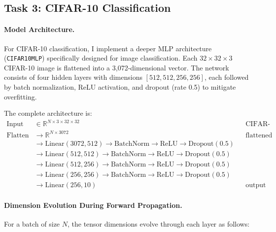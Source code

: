 \documentclass[11pt,a4paper]{article}
\begin{document}
\subsection{Task 3: CIFAR-10 Classification}
\paragraph{Model Architecture.} For CIFAR-10 classification, I implement a deeper MLP architecture (\texttt{CIFAR10MLP}) specifically designed for image classification. Each $32 \times 32 \times 3$ CIFAR-10 image is flattened into a 3,072-dimensional vector. The network consists of four hidden layers with dimensions $[512, 512, 256, 256]$, each followed by batch normalization, ReLU activation, and dropout (rate 0.5) to mitigate overfitting.

The complete architecture is:
\begin{align*}
\text{Input} &\in \mathbb{R}^{N \times 3 \times 32 \times 32} && \text{CIFAR-10 images} \\
\text{Flatten} &\rightarrow \mathbb{R}^{N \times 3072} && \text{flattened to vector} \\
&\rightarrow \text{Linear}(3072, 512) \rightarrow \text{BatchNorm} \rightarrow \text{ReLU} \rightarrow \text{Dropout}(0.5) \\
&\rightarrow \text{Linear}(512, 512) \rightarrow \text{BatchNorm} \rightarrow \text{ReLU} \rightarrow \text{Dropout}(0.5) \\
&\rightarrow \text{Linear}(512, 256) \rightarrow \text{BatchNorm} \rightarrow \text{ReLU} \rightarrow \text{Dropout}(0.5) \\
&\rightarrow \text{Linear}(256, 256) \rightarrow \text{BatchNorm} \rightarrow \text{ReLU} \rightarrow \text{Dropout}(0.5) \\
&\rightarrow \text{Linear}(256, 10) && \text{output logits}
\end{align*}

\paragraph{Dimension Evolution During Forward Propagation.} For a batch of size $N$, the tensor dimensions evolve through each layer as follows:
\end{document}

